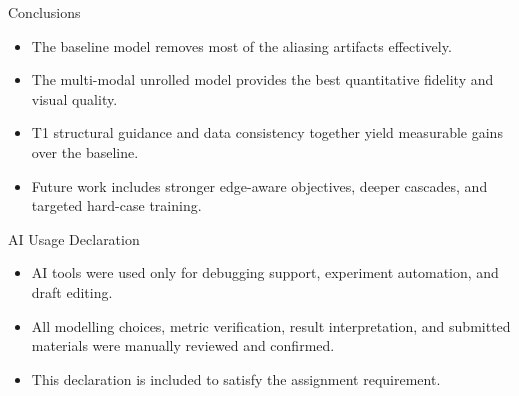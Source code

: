 \documentclass[aspectratio=169,11pt]{beamer}
\begin{document}
\begin{frame}{Conclusions}
\begin{itemize}
  \item The baseline model removes most of the aliasing artifacts effectively.
  \item The multi-modal unrolled model provides the best quantitative fidelity and visual quality.
  \item T1 structural guidance and data consistency together yield measurable gains over the baseline.
  \item Future work includes stronger edge-aware objectives, deeper cascades, and targeted hard-case training.
\end{itemize}
\end{frame}

\begin{frame}{AI Usage Declaration}
\begin{itemize}
  \item AI tools were used only for debugging support, experiment automation, and draft editing.
  \item All modelling choices, metric verification, result interpretation, and submitted materials were manually reviewed and confirmed.
  \item This declaration is included to satisfy the assignment requirement.
\end{itemize}
\end{frame}
\end{document}
